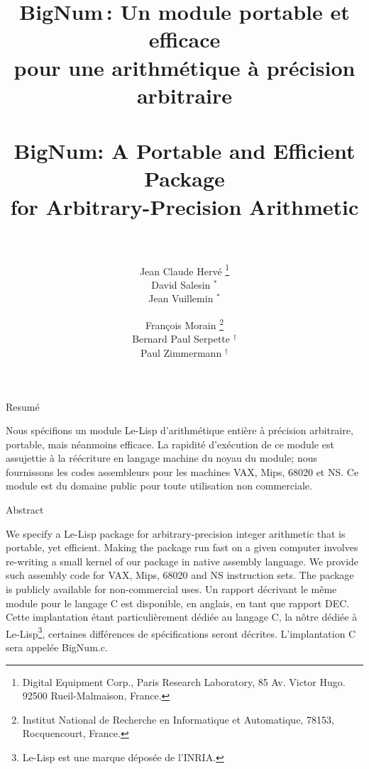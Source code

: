\title{BigNum\,:  Un module portable et efficace \\
pour une arithm\'etique \`a pr\'ecision arbitraire \\
\,\ \\
BigNum:  A Portable and Efficient Package \\ for
Arbitrary-Precision Arithmetic \\ \,\ \\}
\author{
Jean Claude Herv\'e \thanks{Digital Equipment Corp., Paris Research Laboratory,
        85 Av. Victor Hugo.        92500 Rueil-Malmaison, France.} \\
David Salesin $^{*}$ \\
Jean Vuillemin $^{*}$
\and
Fran\c{c}ois Morain \thanks{Institut National de Recherche
        en Informatique et Automatique, 78153, Rocquencourt, France.} \\
Bernard Paul Serpette $^{\dagger}$ \\
Paul Zimmermann $^{\dagger}$ \\
 }
\date{}

\maketitle
\vspace*{48pt}
\begin{center}
Resum\'e
\end{center}
Nous sp\'ecifions un module Le-Lisp d'arithm\'etique enti\`ere \`a
pr\'ecision arbitraire, portable, mais n\'eanmoins efficace. La rapidit\'e
d'ex\'ecution de ce module est assujettie \`a la r\'e\'ecriture en langage
machine du noyau du module; nous fournissons les codes assembleurs pour
les machines VAX, Mips, 68020 et NS. Ce module est du domaine public pour
toute utilisation non commerciale.
\vspace*{48pt}
\begin{center}
Abstract
\end{center}
We specify a Le-Lisp package for arbitrary-precision integer arithmetic that
is portable, yet efficient. Making the package run fast on a given computer
involves re-writing a small kernel of our package in native assembly
language. We provide such assembly code for VAX, Mips, 68020 and NS
instruction sets. The package is publicly
available for non-commercial uses.
\clearpage
Un rapport d\'ecrivant le m\^eme module pour le langage C est disponible,
en anglais, en tant que rapport DEC. Cette implantation \'etant
particuli\`erement d\'edi\'ee au langage C, la n\^otre d\'edi\'ee \`a
Le-Lisp\footnote{Le-Lisp est une marque d\'epos\'ee de l'INRIA.}, certaines
diff\'erences de sp\'ecifications seront d\'ecrites. L'implantation C sera
appel\'ee BigNum.c.

